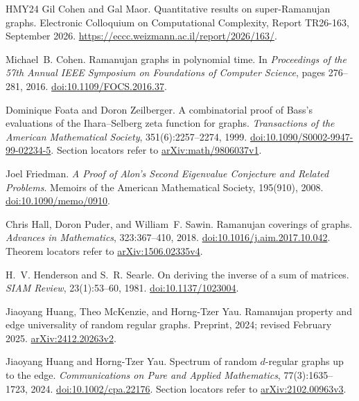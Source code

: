 \begin{thebibliography}{HMY24}
Gil Cohen and Gal Maor.
\newblock Quantitative results on super-Ramanujan graphs.
\newblock Electronic Colloquium on Computational Complexity, Report TR26-163,
  September 2026.
\newblock \url{https://eccc.weizmann.ac.il/report/2026/163/}.

Michael~B. Cohen.
\newblock Ramanujan graphs in polynomial time.
\newblock In \emph{Proceedings of the 57th Annual IEEE Symposium on
  Foundations of Computer Science}, pages 276--281, 2016.
\newblock \href{https://doi.org/10.1109/FOCS.2016.37}{doi:10.1109/FOCS.2016.37}.

Dominique Foata and Doron Zeilberger.
\newblock A combinatorial proof of Bass's evaluations of the
  Ihara--Selberg zeta function for graphs.
\newblock \emph{Transactions of the American Mathematical Society},
  351(6):2257--2274, 1999.
\newblock \href{https://doi.org/10.1090/S0002-9947-99-02234-5}{doi:10.1090/S0002-9947-99-02234-5}.
\newblock Section locators refer to
\href{https://arxiv.org/abs/math/9806037v1}{arXiv:math/9806037v1}.

Joel Friedman.
\newblock \emph{A Proof of Alon's Second Eigenvalue Conjecture and Related Problems}.
\newblock Memoirs of the American Mathematical Society, 195(910), 2008.
\newblock \href{https://doi.org/10.1090/memo/0910}{doi:10.1090/memo/0910}.

Chris Hall, Doron Puder, and William~F. Sawin.
\newblock Ramanujan coverings of graphs.
\newblock \emph{Advances in Mathematics}, 323:367--410, 2018.
\newblock \href{https://doi.org/10.1016/j.aim.2017.10.042}{doi:10.1016/j.aim.2017.10.042}.
\newblock Theorem locators refer to
\href{https://arxiv.org/abs/1506.02335v4}{arXiv:1506.02335v4}.

H.~V. Henderson and S.~R. Searle.
\newblock On deriving the inverse of a sum of matrices.
\newblock \emph{SIAM Review}, 23(1):53--60, 1981.
\newblock \href{https://doi.org/10.1137/1023004}{doi:10.1137/1023004}.

Jiaoyang Huang, Theo McKenzie, and Horng-Tzer Yau.
\newblock Ramanujan property and edge universality of random regular graphs.
\newblock Preprint, 2024; revised February 2025.
\newblock \href{https://arxiv.org/abs/2412.20263v2}{arXiv:2412.20263v2}.

Jiaoyang Huang and Horng-Tzer Yau.
\newblock Spectrum of random $d$-regular graphs up to the edge.
\newblock \emph{Communications on Pure and Applied Mathematics},
  77(3):1635--1723, 2024.
\newblock \href{https://doi.org/10.1002/cpa.22176}{doi:10.1002/cpa.22176}.
\newblock Section locators refer to
\href{https://arxiv.org/abs/2102.00963v3}{arXiv:2102.00963v3}.


\end{thebibliography}
